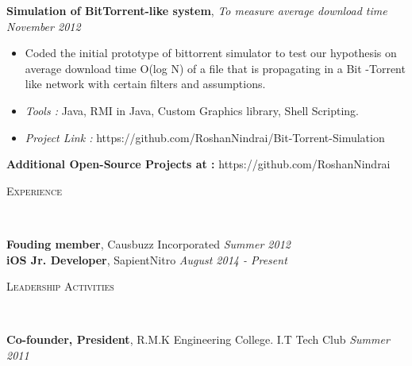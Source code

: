 \documentclass[9pt]{article}
\newenvironment{changemargin}[2]{%
  \begin{list}{}{%
    \setlength{\topsep}{0pt}%
    \setlength{\leftmargin}{#1}%
    \setlength{\rightmargin}{#2}%
    \setlength{\listparindent}{\parindent}%
    \setlength{\itemindent}{\parindent}%
    \setlength{\parsep}{\parskip}%
  }%
  \item[]}{\end{list}
}
\newcommand{\lineover}{
	\begin{changemargin}{-0.05in}{-0.05in}
		\vspace*{-8pt}
		\hrulefill \\
		\vspace*{-2pt}
	\end{changemargin}
}
\newcommand{\header}[1]{
	\begin{changemargin}{-0.5in}{-0.5in}
		\scshape{#1}\\
  	\lineover
	\end{changemargin}
}
\newenvironment{body} {
	\vspace*{-16pt}
	\begin{changemargin}{-0.25in}{-0.5in}
  }	
	{\end{changemargin}
}
\begin{document}
\begin{body}
\begin{itemize}
	\end{itemize}
\textbf {Simulation of BitTorrent-like system}, \emph{To measure average download time} \hfill \emph{November 2012}\\
	\vspace*{-4pt}
	\begin{itemize} \itemsep -0pt
		\item Coded the initial  prototype of bittorrent simulator to test our hypothesis on average download time O(log N) of a file that is propagating in a Bit -Torrent like network with certain filters and assumptions.
		\item \emph{Tools :} Java, RMI in Java, Custom Graphics library, Shell Scripting.
\item \emph{ Project Link :} https://github.com/RoshanNindrai/Bit-Torrent-Simulation
	
	\end{itemize}
\vspace*{+30pt}

\textbf {Additional Open-Source Projects at :} https://github.com/RoshanNindrai 
\end{body}
\smallskip



\header{Experience}

\begin{body}
	\vspace{14pt}
	\textbf{Fouding member}, Causbuzz Incorporated \hfill {}\emph{Summer 2012}\\
	\textbf{iOS Jr. Developer}, SapientNitro \hfill {}\emph{August 2014 - Present}\\	
	\smallskip
	
\end{body}

\smallskip




\header{Leadership Activities}

\begin{body}
	\vspace{14pt}
	\textbf{Co-founder, President}, R.M.K Engineering College. I.T Tech Club \hfill {} \emph{Summer 2011}\\
	\smallskip
	
\end{body}
\end{document}
